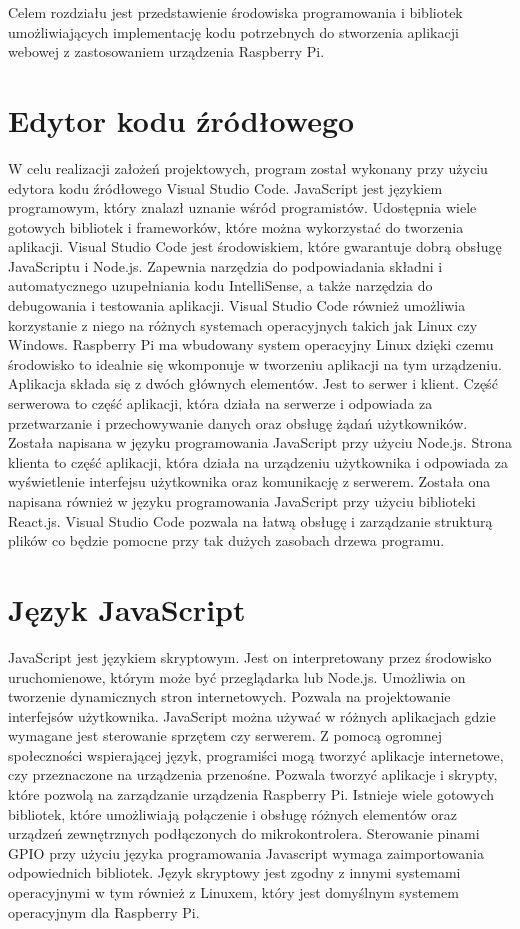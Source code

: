 Celem rozdziału jest przedstawienie środowiska programowania i bibliotek umożliwiających implementację kodu potrzebnych do stworzenia aplikacji webowej z zastosowaniem urządzenia Raspberry Pi.

\section{Edytor kodu źródłowego}
W celu realizacji założeń projektowych, program został wykonany przy użyciu edytora kodu źródłowego Visual Studio Code. JavaScript jest językiem programowym, który znalazł uznanie wśród programistów. Udostępnia wiele gotowych bibliotek i frameworków, które można wykorzystać do tworzenia aplikacji. Visual Studio Code jest środowiskiem, które gwarantuje dobrą obsługę JavaScriptu i Node.js. Zapewnia narzędzia do podpowiadania składni i automatycznego uzupełniania kodu IntelliSense, a także narzędzia do debugowania i testowania aplikacji. Visual Studio Code również umożliwia korzystanie z niego na różnych systemach operacyjnych takich jak Linux czy Windows. Raspberry Pi ma wbudowany system operacyjny Linux dzięki czemu środowisko to idealnie się wkomponuje w tworzeniu aplikacji na tym urządzeniu. Aplikacja składa się z dwóch głównych elementów. Jest to serwer i klient. Część serwerowa to część aplikacji, która działa na serwerze i odpowiada za przetwarzanie i przechowywanie danych oraz obsługę żądań użytkowników. Została napisana w języku programowania JavaScript przy użyciu Node.js. Strona klienta to część aplikacji, która działa na urządzeniu użytkownika i odpowiada za wyświetlenie interfejsu użytkownika oraz komunikację z serwerem. Została ona napisana również w języku programowania JavaScript przy użyciu biblioteki React.js. Visual Studio Code pozwala na łatwą obsługę i zarządzanie strukturą plików co będzie pomocne przy tak dużych zasobach drzewa programu.

\section{Język JavaScript}
JavaScript jest językiem skryptowym. Jest on interpretowany przez środowisko uruchomienowe, którym może być przeglądarka lub Node.js. Umożliwia on tworzenie dynamicznych stron internetowych. Pozwala na projektowanie interfejsów użytkownika. JavaScript można używać w różnych aplikacjach gdzie wymagane jest sterowanie sprzętem czy serwerem. Z pomocą ogromnej społeczności wspierającej język, programiści mogą tworzyć aplikacje internetowe, czy przeznaczone na urządzenia przenośne. Pozwala tworzyć aplikacje i skrypty, które pozwolą na zarządzanie urządzenia Raspberry Pi. Istnieje wiele gotowych bibliotek, które umożliwiają połączenie i obsługę różnych elementów oraz urządzeń zewnętrznych podłączonych do mikrokontrolera. Sterowanie pinami GPIO przy użyciu języka programowania Javascript wymaga zaimportowania odpowiednich bibliotek. Język skryptowy jest zgodny z innymi systemami operacyjnymi w tym również z Linuxem, który jest domyślnym systemem operacyjnym dla Raspberry Pi.

